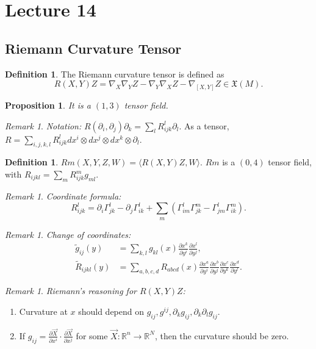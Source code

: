 \documentclass[11pt, a4paper]{article}
\theoremstyle{plain}
\newtheorem{proposition}[theorem]{Proposition}
\theoremstyle{definition}
\newtheorem{definition}[theorem]{Definition}
\theoremstyle{remark}
\newtheorem{remark}[theorem]{Remark}
\begin{document}
\newpage
{
\section{Lecture 14}

\subsection{Riemann Curvature Tensor}

\begin{definition}
The Riemann curvature tensor is defined as
\[ R(X,Y)Z = \nabla_X \nabla_Y Z - \nabla_Y \nabla_X Z - \nabla_{[X,Y]} Z \in \mathfrak{X}(M). \]
\end{definition}

\begin{proposition}
It is a $(1,3)$ tensor field.
\end{proposition}

\begin{remark}\textit{Notation:}
$R(\partial_i, \partial_j)\partial_k = \sum_l R_{ijk}^l \partial_l$. As a tensor, $R = \sum_{i,j,k,l} R_{ijk}^l dx^i \otimes dx^j \otimes dx^k \otimes \partial_l$.
\end{remark}

\begin{definition}
$Rm(X,Y,Z,W) = \langle R(X,Y)Z, W \rangle$. $Rm$ is a $(0,4)$ tensor field, with $R_{ijkl} = \sum_m R_{ijk}^m g_{ml}$.
\end{definition}

\begin{remark}\textit{Coordinate formula:}
\[ R_{ijk}^l = \partial_i \Gamma_{jk}^l - \partial_j \Gamma_{ik}^l + \sum_m \left( \Gamma_{im}^l \Gamma_{jk}^m - \Gamma_{jm}^l \Gamma_{ik}^m \right). \]
\end{remark}

\begin{remark}\textit{Change of coordinates:}
\begin{align*}
\tilde{g}_{ij}(y) &= \sum_{k,l} g_{kl}(x) \frac{\partial x^k}{\partial y^i} \frac{\partial x^l}{\partial y^j}, \\
\tilde{R}_{ijkl}(y) &= \sum_{a,b,c,d} R_{abcd}(x) \frac{\partial x^a}{\partial y^i} \frac{\partial x^b}{\partial y^j} \frac{\partial x^c}{\partial y^k} \frac{\partial x^d}{\partial y^l}.
\end{align*}
\end{remark}

\begin{remark}\textit{Riemann's reasoning for $R(X,Y)Z$:}
\begin{enumerate}
    \item Curvature at $x$ should depend on $g_{ij}, g^{ij}, \partial_k g_{ij}, \partial_k \partial_l g_{ij}$.
    \item If $g_{ij} = \frac{\partial \vec{X}}{\partial x^i} \cdot \frac{\partial \vec{X}}{\partial x^j}$ for some $\vec{X} : \mathbb{R}^n \to \mathbb{R}^N$, then the curvature should be zero.
\end{enumerate}
\end{remark}

}
\end{document}
